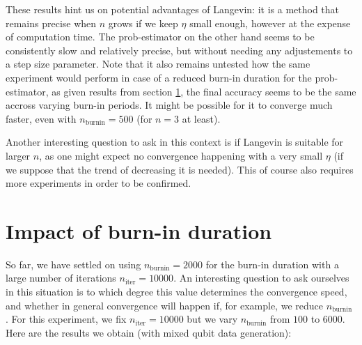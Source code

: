 \documentclass[12pt]{memoir}
\newcommand{\nitern}[1]{$n_{\text{iter}}=#1$}
\newcommand{\nburninn}[1]{$n_{\text{burnin}}=#1$}
\newcommand{\nburnin}[0]{$n_{\text{burnin}} $ }
\begin{document}
These results hint us on potential advantages of Langevin: it is a method that remains precise when $n$ grows if we keep $\eta$ small enough, however at the expense of computation time. The prob-estimator on the other hand seems to be consistently slow and relatively precise, but without needing any adjustements to a step size parameter. Note that it also remains untested how the same experiment would perform in case of a reduced burn-in duration for the prob-estimator, as given results from section \ref{section:comp-burnin}, the final accuracy seems to be the same accross varying burn-in periods. It might be possible for it to converge much faster, even with \nburninn{500} (for $n=3$ at least).\medbreak

Another interesting question to ask in this context is if Langevin is suitable for larger $n$, as one might expect no convergence happening with a very small $\eta$ (if we suppose that the trend of decreasing it is needed). This of course also requires more experiments in order to be confirmed.

\section{Impact of burn-in duration}\label{section:comp-burnin}
So far, we have settled on using \nburninn{2000} for the burn-in duration with a large number of iterations \nitern{10000}. An interesting question to ask ourselves in this situation is to which degree this value determines the convergence speed, and whether in general convergence will happen if, for example, we reduce \nburnin. For this experiment, we fix \nitern{10000} but we vary \nburnin from $100$ to $6000$. Here are the results we obtain (with mixed qubit data generation):
\end{document}
